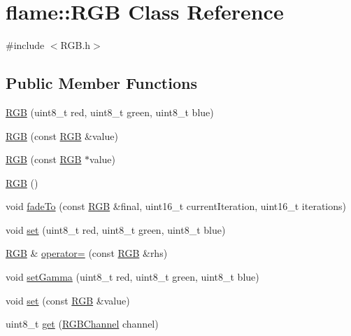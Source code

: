 \hypertarget{classflame_1_1_r_g_b}{\section{flame\-:\-:R\-G\-B Class Reference}
\label{classflame_1_1_r_g_b}
}


{\ttfamily \#include $<$R\-G\-B.\-h$>$}

\subsection*{Public Member Functions}
\begin{DoxyCompactItemize}
\item 
\hyperlink{classflame_1_1_r_g_b_a31a76381cdc18f4652de93d25b209d3e}{R\-G\-B} (uint8\-\_\-t red, uint8\-\_\-t green, uint8\-\_\-t blue)
\item 
\hyperlink{classflame_1_1_r_g_b_a78352769285295d0ec68279fbaf1f0ba}{R\-G\-B} (const \hyperlink{classflame_1_1_r_g_b}{R\-G\-B} \&value)
\item 
\hyperlink{classflame_1_1_r_g_b_ad0fd397169a383bc643418612ddf64dd}{R\-G\-B} (const \hyperlink{classflame_1_1_r_g_b}{R\-G\-B} $\ast$value)
\item 
\hyperlink{classflame_1_1_r_g_b_a8d41ef1df927aabd3477024387aa3a41}{R\-G\-B} ()
\item 
void \hyperlink{classflame_1_1_r_g_b_a7be20787cdb4933a3a44dbe8236693dc}{fade\-To} (const \hyperlink{classflame_1_1_r_g_b}{R\-G\-B} \&final, uint16\-\_\-t current\-Iteration, uint16\-\_\-t iterations)
\item 
void \hyperlink{classflame_1_1_r_g_b_a0848bc3467a0545191bb5e3ad6bc004c}{set} (uint8\-\_\-t red, uint8\-\_\-t green, uint8\-\_\-t blue)
\item 
\hyperlink{classflame_1_1_r_g_b}{R\-G\-B} \& \hyperlink{classflame_1_1_r_g_b_abc571808888b8fd2715f7ff1f5ee8c1d}{operator=} (const \hyperlink{classflame_1_1_r_g_b}{R\-G\-B} \&rhs)
\item 
void \hyperlink{classflame_1_1_r_g_b_a1dedc5574dceb31c1fc71212ba0bdf1f}{set\-Gamma} (uint8\-\_\-t red, uint8\-\_\-t green, uint8\-\_\-t blue)
\item 
void \hyperlink{classflame_1_1_r_g_b_aebfd60e533ed78c38f6932ac33d0773b}{set} (const \hyperlink{classflame_1_1_r_g_b}{R\-G\-B} \&value)
\item 
uint8\-\_\-t \hyperlink{classflame_1_1_r_g_b_a1c7cfd27fd68436e8ec878b50c755559}{get} (\hyperlink{namespaceflame_a47f12f0248f648dbdbfa6fe26d79028d}{R\-G\-B\-Channel} channel)

\end{DoxyCompactItemize}
